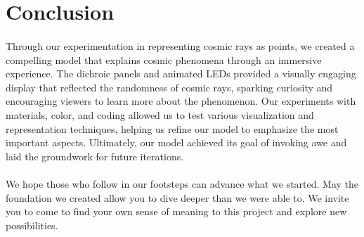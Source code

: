 \documentclass{article}
\begin{document}
\section{Conclusion}
\paragraph{}Through our experimentation in representing cosmic rays as points, we created a compelling model that explains cosmic phenomena through an immersive experience. The dichroic panels and animated LEDs provided a visually engaging display that reflected the randomness of cosmic rays, sparking curiosity and encouraging viewers to learn more about the phenomenon. Our experiments with materials, color, and coding allowed us to test various visualization and representation techniques, helping us refine our model to emphasize the most important aspects. Ultimately, our model achieved its goal of invoking awe and laid the groundwork for future iterations.
\paragraph{}We hope those who follow in our footsteps can advance what we started. May the foundation we created allow you to dive deeper than we were able to. We invite you to come to find your own sense of meaning to this project and explore new possibilities. 
\end{document}
